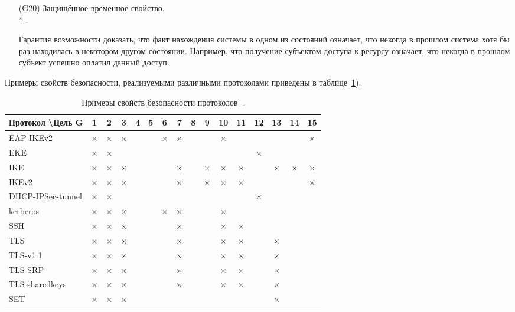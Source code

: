 \begin{itemize}
	\item[(G20)] Защищённое временное свойство.\\*
		.
	\item[{}] Гарантия возможности доказать, что факт нахождения системы в одном из состояний означает, что некогда в прошлом система хотя бы раз находилась в некотором другом состоянии. Например, что получение субъектом доступа к ресурсу означает, что некогда в прошлом субъект успешно оплатил данный доступ.

\end{itemize}

Примеры свойств безопасности, реализуемыми различными протоколами приведены в таблице~\ref{tab:protocols-properties}).

\begin{landscape}
{\renewcommand{\arraystretch}{1.5}
\begin{table}
    \centering
    \begin{tabular}{|l|c|c|c|c|c|c|c|c|c|c|c|c|c|c|c|}
        \hline
Протокол \textbackslash Цель G & 1 & 2 & 3 & 4 & 5 & 6 & 7 & 8 & 9 & 10 & 11 & 12 & 13 & 14 & 15 \\
        \hline
        EAP-IKEv2              & × & × & × &   &   & × & × &   &   &  × &    &    &    &    &  × \\
        \hline
        EKE                    & × & × &   &   &   &   &   &   &   &    &    &  × &    &    &    \\
        \hline
        IKE                    & × & × & × &   &   &   & × &   & × &  × &  × &    &  × &  × &  × \\
        \hline
        IKEv2                  & × & × & × &   &   &   & × &   & × &  × &  × &    &    &    &  × \\
        \hline
        DHCP-IPSec-tunnel      & × & × &   &   &   &   &   &   &   &    &    &  × &    &    &    \\
        \hline
        kerberos               & × & × & × &   &   & × & × &   &   &  × &    &    &    &    &    \\
        \hline
        SSH                    & × & × & × &   &   &   & × &   &   &  × &  × &    &    &    &    \\
        \hline
        TLS                    & × & × & × &   &   &   & × &   &   &  × &  × &    &  × &    &    \\
        \hline
        TLS-v1.1               & × & × & × &   &   &   & × &   &   &  × &  × &    &  × &    &    \\
        \hline
        TLS-SRP                & × & × & × &   &   &   & × &   &   &  × &  × &    &  × &    &    \\
        \hline
        TLS-sharedkeys         & × & × & × &   &   &   & × &   &   &  × &  × &    &  × &    &    \\
        \hline
        SET                    & × & × & × &   &   &   &   &   &   &    &    &    &  × &    &    \\
        \hline
    \end{tabular}
    \caption{Примеры свойств безопасности протоколов~\cite{Cheremushkin:2009}.}
    \label{tab:protocols-properties}
\end{table}
}
\end{landscape}
